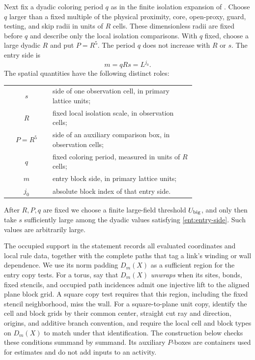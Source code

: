 Next fix a dyadic coloring period \(q\) as in the finite isolation
expansion of \cite[Section~9]{B}.  Choose \(q\) larger than a fixed
multiple of the physical proximity, core, open-proxy, guard, testing,
and skip radii in units of \(R\) cells.  These dimensionless radii are
fixed before \(q\) and describe only the local isolation comparisons.
With \(q\) fixed, choose a large dyadic \(R\) and put \(P=R^5\).
The period \(q\) does not increase with \(R\) or \(s\).  The entry
side is
\begin{equation}\label{ent:entry-side}
                     m=qRs=L^{j_0}.
\end{equation}
The spatial quantities have the following distinct roles:
\begin{center}
\begin{tabular}{@{}c@{\quad}p{0.76\linewidth}@{}}
\(s\) & side of one observation cell, in primary lattice units;\\
\(R\) & fixed local isolation scale, in observation cells;\\
\(P=R^5\) & side of an auxiliary comparison box, in observation cells;\\
\(q\) & fixed coloring period, measured in units of \(R\) cells;\\
\(m\) & entry block side, in primary lattice units;\\
\(j_0\) & absolute block index of that entry side.
\end{tabular}
\end{center}
After \(R,P,q\) are fixed we choose a finite large-field threshold
\(U_{\rm big}\), and only then
take \(s\) sufficiently large among the dyadic values satisfying
\eqref{ent:entry-side}.  Such values are arbitrarily large.

The occupied support in the statement records all evaluated
coordinates and local rule data, together with the complete paths
that tag a link's winding or wall dependence.  We use its norm
padding \(D_m(X)\) as a sufficient region for the entry copy tests.
For a torus, say that \(D_m(X)\) \emph{unwraps} when its sites, bonds,
fixed stencils, and occupied path incidences admit one injective lift
to the aligned plane block grid.  A square copy test requires that
this region, including the fixed stencil neighborhood, miss the
wall.  For a square-to-plane unit copy, identify the cell and block
grids by their common center, straight cut ray and direction, origins,
and additive branch convention, and require the local cell and block
types on \(D_m(X)\) to match under that identification.
The construction below checks these
conditions summand by summand.  Its auxiliary \(P\)-boxes are
containers used for estimates and do not add inputs to an activity.

